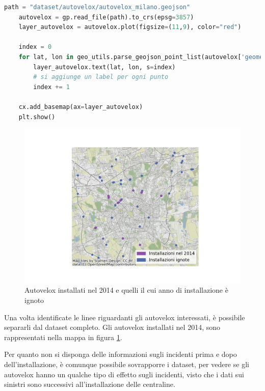 \documentclass[a4paper]{report}
\begin{document}
\begin{lstlisting}[language=Python]
    path = "dataset/autovelox/autovelox_milano.geojson"
    autovelox = gp.read_file(path).to_crs(epsg=3857)
    layer_autovelox = autovelox.plot(figsize=(11,9), color="red")
    
    index = 0
    for lat, lon in geo_utils.parse_geojson_point_list(autovelox['geometry'].astype(str)):
        layer_autovelox.text(lat, lon, s=index)
        # si aggiunge un label per ogni punto
        index += 1
    
    cx.add_basemap(ax=layer_autovelox)
    plt.show()
\end{lstlisting}

\begin{figure}
    \includegraphics[width=\linewidth]{../src/autovelox/autovelox_2014.png}
    \caption{Autovelox installati nel 2014 e quelli il cui anno di installazione è ignoto}
    \label{fig:autovelox-indici}
\end{figure}

Una volta identificate le linee riguardanti gli autovelox interessati, è possibile separarli 
dal dataset completo.
Gli autovelox installati nel 2014, sono rappresentati nella mappa in 
figura \ref{fig:autovelox-indici}.

Per quanto non si disponga delle informazioni sugli incidenti prima e dopo dell'installazione, 
è comunque possibile sovrapporre i dataset, per vedere se gli autovelox hanno un qualche tipo di 
effetto sugli incidenti, visto che i dati sui sinistri sono successivi all'installazione delle centraline.
\end{document}
